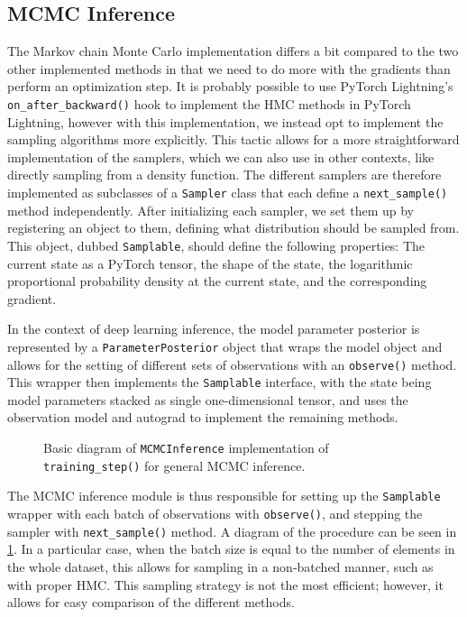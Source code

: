 \subsection{MCMC Inference}
The Markov chain Monte Carlo implementation differs a bit compared to the two other implemented methods in that we need to do more with the gradients than perform an optimization step. 
It is probably possible to use PyTorch Lightning's \texttt{on\_after\_backward()} hook to implement the HMC methods in PyTorch Lightning, however with this implementation, we instead opt to implement the sampling algorithms more explicitly.
This tactic allows for a more straightforward implementation of the samplers, which we can also use in other contexts, like directly sampling from a density function.
The different samplers are therefore implemented as  subclasses of a \texttt{Sampler} class that each define a \texttt{next\_sample()} method independently.
After initializing each sampler, we set them up by registering an object to them, defining what distribution should be sampled from. 
This object, dubbed \texttt{Samplable}, should define the following properties: The current state as a PyTorch tensor, the shape of the state, the logarithmic proportional probability density at the current state, and the corresponding gradient.  

In the context of deep learning inference, the model parameter posterior is represented by a \texttt{ParameterPosterior} object that wraps the model object and allows for the setting of different sets of observations with an \texttt{observe()} method.
This wrapper then implements the \texttt{Samplable} interface, with the state being model parameters stacked as single one-dimensional tensor, and uses the observation model and autograd to implement the remaining methods.
\begin{figure}[htbp]
    \centering
    
    \caption{Basic diagram of \texttt{MCMCInference} implementation of \texttt{training\_step()} for general MCMC inference.}
    \label{fig:mcmc-arch}
\end{figure}
The MCMC inference module is thus responsible for setting up the \texttt{Samplable} wrapper with each batch of observations with \texttt{observe()}, and stepping the sampler with \texttt{next\_sample()} method. 
A diagram of the procedure can be seen in \cref{fig:mcmc-arch}.
In a particular case, when the batch size is equal to the number of elements in the whole dataset, this allows for sampling in a non-batched manner, such as with proper HMC.
This sampling strategy is not the most efficient; however, it allows for easy comparison of the different methods.

